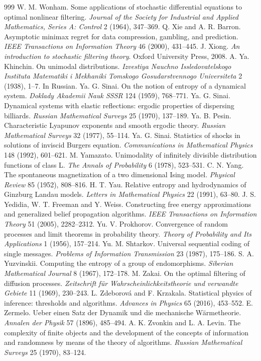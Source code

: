 \begin{thebibliography}{999}
 W. M. Wonham. Some applications of stochastic differential equations to optimal nonlinear filtering. \emph{Journal of the Society for Industrial and Applied Mathematics, Series A: Control} 2 (1964), 347--369.
 Q. Xie and A. R. Barron. Asymptotic minimax regret for data compression, gambling, and prediction. \emph{IEEE Transactions on Information Theory} 46 (2000), 431--445.
 J. Xiong. \emph{An introduction to stochastic filtering theory}. Oxford University Press, 2008.
 A. Ya. Khinchin. On unimodal distributions. \emph{Izvestiya Nauchno Issledovatelskogo Instituta Matematiki i Mekhaniki Tomskogo Gosudarstvennogo Universiteta} 2 (1938), 1--7. In Russian.
 Ya. G. Sinai. On the notion of entropy of a dynamical system. \emph{Doklady Akademii Nauk SSSR} 124 (1959), 768--771.
 Ya. G. Sinai. Dynamical systems with elastic reflections: ergodic properties of dispersing billiards. \emph{Russian Mathematical Surveys} 25 (1970), 137--189.
 Ya. B. Pesin. Characteristic Lyapunov exponents and smooth ergodic theory. \emph{Russian Mathematical Surveys} 32 (1977), 55--114.
 Ya. G. Sinai. Statistics of shocks in solutions of inviscid Burgers equation. \emph{Communications in Mathematical Physics} 148 (1992), 601--621.
 M. Yamazato. Unimodality of infinitely divisible distribution functions of class L. \emph{The Annals of Probability} 6 (1978), 523--531.
 C. N. Yang. The spontaneous magnetization of a two dimensional Ising model. \emph{Physical Review} 85 (1952), 808--816.
 H. T. Yau. Relative entropy and hydrodynamics of Ginzburg Landau models. \emph{Letters in Mathematical Physics} 22 (1991), 63--80.
 J. S. Yedidia, W. T. Freeman and Y. Weiss. Constructing free energy approximations and generalized belief propagation algorithms. \emph{IEEE Transactions on Information Theory} 51 (2005), 2282--2312.
 Yu. V. Prokhorov. Convergence of random processes and limit theorems in probability theory. \emph{Theory of Probability and Its Applications} 1 (1956), 157--214.
 Yu. M. Shtarkov. Universal sequential coding of single messages. \emph{Problems of Information Transmission} 23 (1987), 175--186.
 S. A. Yuzvinskii. Computing the entropy of a group of endomorphisms. \emph{Siberian Mathematical Journal} 8 (1967), 172--178.
 M. Zakai. On the optimal filtering of diffusion processes. \emph{Zeitschrift f\"ur Wahrscheinlichkeitstheorie und verwandte Gebiete} 11 (1969), 230--243.
 L. Zdeborov\'a and F. Krzakala. Statistical physics of inference: thresholds and algorithms. \emph{Advances in Physics} 65 (2016), 453--552.
 E. Zermelo. Ueber einen Satz der Dynamik und die mechanische W\"armetheorie. \emph{Annalen der Physik} 57 (1896), 485--494.
 A. K. Zvonkin and L. A. Levin. The complexity of finite objects and the development of the concepts of information and randomness by means of the theory of algorithms. \emph{Russian Mathematical Surveys} 25 (1970), 83--124.

\end{thebibliography}
